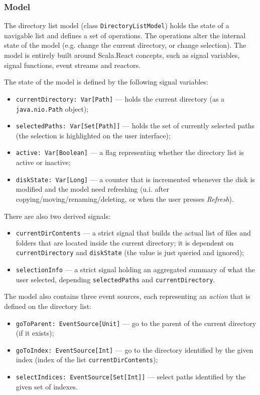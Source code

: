 \subsubsection{Model}

The directory list model (class \texttt{DirectoryListModel}) holds the state of a navigable list and defines a set of operations. The operations alter the internal state of the model (e.g. change the current directory, or change selection). The model is entirely built around Scala.React concepts, such as signal variables, signal functions, event streams and reactors.

The state of the model is defined by the following signal variables:
\begin{itemize}
\item \texttt{currentDirectory: Var[Path]} --- holds the current directory (as a \texttt{java.nio.Path} object);
\item \texttt{selectedPaths: Var[Set[Path]]} --- holds the set of currently selected paths (the selection is highlighted on the user interface);
\item \texttt{active: Var[Boolean]} --- a flag representing whether the directory list is active or inactive;
\item \texttt{diskState: Var[Long]} --- a counter that is incremented whenever the disk is modified and the model need refreshing (u.i. after copying/moving/renaming/deleting, or when the user presses \emph{Refresh}).
\end{itemize}

There are also two derived signals:
\begin{itemize}

\item \texttt{currentDirContents} --- a strict signal that builds the actual list of files and folders that are located inside the current directory; it is dependent on \texttt{currentDirectory} and \texttt{diskState} (the value is just queried and ignored);

\item \texttt{selectionInfo} --- a strict signal holding an aggregated summary of what the user selected, depending \texttt{selectedPaths} and \texttt{currentDirectory}.
\end{itemize}

The model also contains three event sources, each representing an \emph{action} that is defined on the directory list:
\begin{itemize}
\item \texttt{goToParent: EventSource[Unit]} --- go to the parent of the current directory (if it exists);
\item \texttt{goToIndex: EventSource[Int]} --- go to the directory identified by the given index (index of the list \texttt{currentDirContents});
\item \texttt{selectIndices: EventSource[Set[Int]]} --- select paths identified by the given set of indexes.
\end{itemize}


